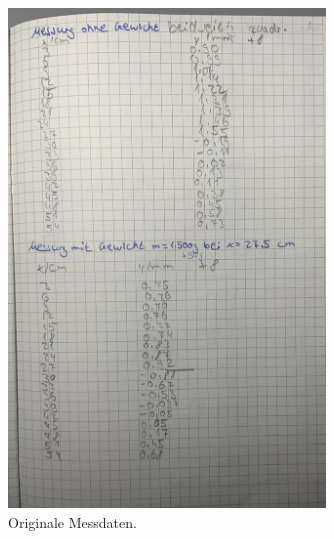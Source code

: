 \begin{figure}[H]
    \centering
    \includegraphics[width=0.75\textwidth]{Dateien/Bild2.jpeg}
    \caption{Originale Messdaten.}
    \label{fig:daten2}
\end{figure}

